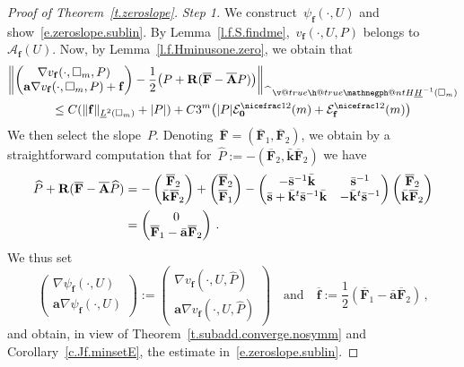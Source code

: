 \documentclass[11pt,twoside]{article} %
\makeatletter
\let\oldsquare\square %
\renewcommand{\square}{\oldsquare}
\numberwithin{equation}{section}
\theoremstyle{definition}
\renewcommand*{\hat}{\widehat}
\newcommand{\qand}{\quad \mbox{and} \quad }
\newcommand{\f}{\mathbf{f}}
\renewcommand{\a}{\mathbf{a}}
\newcommand{\ahom}{\bar{\a}}
\newcommand{\shom}{\bar{\mathbf{s}}}
\newcommand{\khom}{\bar{\mathbf{k}}}
\newcommand{\bfzero}{\boldsymbol{0}}
\newcommand{\cu}{\square}
\newcommand{\negphantom}{\v@true\h@true\negph@nt}
\newcommand{\negph@nt}{\ifmmode\expandafter\mathpalette 
  \expandafter\mathnegph@nt\else\expandafter\makenegph@nt\fi}
\newcommand{\makenegph@nt}[1]{%
  \setbox\z@\hbox{\color@begingroup#1\color@endgroup}\finnegph@nt}
\newcommand{\finnegph@nt}{%
  \setbox\tw@\null 
  \ifv@ \ht\tw@\ht\z@\dp\tw@\dp\z@\fi \ifh@\wd\tw@-\wd\z@\fi\box\tw@}
\newcommand{\mathnegph@nt}[2]{%
  \setbox\z@\hbox{$\m@th #1{#2}$}\finnegph@nt}
\newcommand{\Hminusul}{\hat{\phantom{H}}\negphantom{H}\underline{H}^{-1}}
\newcommand{\bfAhom}{\overline{\mathbf{A}}}
\newcommand{\bfF}{\mathbf{F}}
\newcommand{\rota}{\mathbf{R}}
\makeatother
\begin{document}
\begin{proof}[{Proof of Theorem~\ref{t.zeroslope}}]
\emph{Step 1.} We construct~$\psi_{\f}(\cdot,U)$ and show~\eqref{e.zeroslope.sublin}. By Lemma~\ref{l.f.S.findme},~$v_{\f}(\cdot,U,P)$ belongs to~$\mathcal{A}_{\f}(U)$. 
Now, by Lemma~\ref{l.f.Hminusone.zero}, we obtain that 
\begin{multline*}  
\biggl\| \begin{pmatrix} \nabla v_{\f}(\cdot,\cu_m,P)  \\ \a \nabla v_{\f}(\cdot,\cu_m,P) + \f \end{pmatrix}    - \frac12 \bigr( P+ \rota (\overline{\bfF} - \bfAhom P)  \bigl)  \biggr\|_{\Hminusul(\cu_m)} 
\\
\leq
C( \| \f \|_{\underline{L}^2(\cu_m)} + |P|) + C3^m \bigl(  |P| \mathcal{E}_{\bfzero}^{\nicefrac12}(m) + \mathcal{E}_{\f}^{\nicefrac12}(m) \bigr) 
\end{multline*}
We then select the slope~$P$. Denoting~$\overline{\bfF}  = (\overline{\bfF}_1, \overline{\bfF}_2)$, we obtain by a straightforward computation that for~$\hat{P} := - ( \overline{\bfF}_2 , \khom \overline{\bfF}_2)$  
we have 
\begin{align*} 
\hat{P}+ \rota (\overline{\bfF} - \bfAhom \hat{P})
&
= 
- \begin{pmatrix}  \overline{\bfF}_2 \\ \khom \overline{\bfF}_2 \end{pmatrix}  
+\begin{pmatrix}  \overline{\bfF}_2 \\  \overline{\bfF}_1\end{pmatrix}  
- \begin{pmatrix} -\shom^{-1} \khom  & \shom^{-1}  \\ \shom + \khom^t \shom^{-1} \khom & - \khom^t \shom^{-1} \end{pmatrix} \begin{pmatrix} \overline{\bfF}_2 \\ \khom \overline{\bfF}_2 \end{pmatrix} 
\notag \\ &
=
\begin{pmatrix} 0  \\  
 \overline{\bfF}_1 - \ahom \overline{\bfF}_2  \end{pmatrix}
\,.
\end{align*}
We thus set
\begin{equation*}  
\begin{pmatrix} \nabla \psi_{\f}(\cdot,U)  \\ \a \nabla \psi_{\f}(\cdot,U) \end{pmatrix} 
:=
\begin{pmatrix} \nabla v_{\f}(\cdot,U,\hat{P})  \\ \a \nabla v_{\f}(\cdot,U,\hat{P} ) \end{pmatrix} 
\qand
\overline{\f}  := \frac12 ( \overline{\bfF}_1 - \ahom\overline{\bfF}_2)
\,, 
\end{equation*}
and obtain, in view of Theorem~\ref{t.subadd.converge.nosymm} and
Corollary~\ref{c.Jf.minsetE}, the estimate in~\eqref{e.zeroslope.sublin}.



\end{proof}
\end{document}
